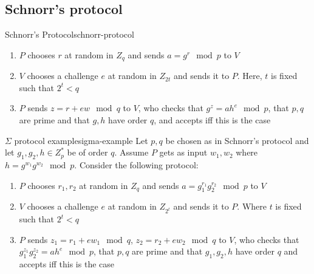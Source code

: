 \subsection{Schnorr's protocol}
\begin{protocol}{Schnorr's Protocol}{schnorr-protocol}
  \begin{enumerate}
  	\item $P$ chooses $r$ at random in $Z_q$ and sends $a=g^r \mod p$ to $V$
    \item $V$ chooses a challenge $e$ at random in $Z_{2t}$ and sends it to $P$. Here, $t$ is fixed such that $2^t < q$ 
    \item $P$ sends $z=r+ew \mod q$ to $V$, who checks that $g^z = ah^e \mod p$, that $p,q$ are prime and that $g,h$ have order $q$, and accepts iff this is the case
  \end{enumerate}
\end{protocol}

\begin{protocol}{$\Sigma$ protocol example}{sigma-example}
  Let $p,q$ be chosen as in Schnorr's protocol and let $g_1, g_2, h \in Z^*_p$ be of order $q$. Assume $P$ gets as input $w_1, w_2$ where $h = g^{w_1}g^{w_2} \mod p$. Consider the following protocol:
  \begin{enumerate}
    \item $P$ chooses $r_1,r_2$ at random in $Z_q$ and sends $a = g_1^{r_1} g_2^{r_2} \mod p$ to $V$
    \item $V$ chooses a challenge $e$ at random in $Z_{2^t}$ and sends it to $P$. Where $t$ is fixed such that $2^t < q$ 
    \item $P$ sends $z_1 = r_1 + ew_1 \mod q$, $z_2 = r_2 + ew_2 \mod q$ to $V$, who checks that $g_1^{z_1}g_2^{z_2} = ah^e \mod p$, that $p,q$ are prime and that $g_1,g_2, h$ have order $q$ and accepts iff this is the case
  \end{enumerate}
\end{protocol}

